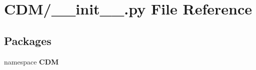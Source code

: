 \section{\-C\-D\-M/\-\_\-\-\_\-init\-\_\-\-\_\-.py \-File \-Reference}
\label{_c_d_m_2____init_____8py}
\subsection*{\-Packages}
\begin{DoxyCompactItemize}
\item 
namespace {\bf \-C\-D\-M}
\end{DoxyCompactItemize}
